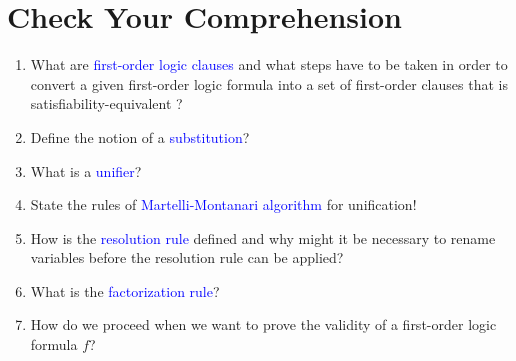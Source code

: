 \section{Check Your Comprehension}
\begin{enumerate}
\item What are \textcolor{blue}{first-order logic clauses} and what steps have to be taken in order to convert
      a given first-order logic formula into a set of first-order clauses that is satisfiability-equivalent ?
\item Define the notion of a \textcolor{blue}{substitution}?
\item What is a \textcolor{blue}{unifier}?
\item State the rules of \textcolor{blue}{Martelli-Montanari algorithm} for unification!
\item How is the \textcolor{blue}{resolution rule} defined and why might it be necessary to rename variables
      before the resolution rule can be applied?
\item What is the \textcolor{blue}{factorization rule}?
\item How do we proceed when we want to prove the validity of a first-order logic formula $f$?
\end{enumerate}


